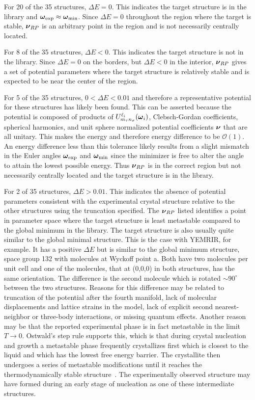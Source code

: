 \documentclass[preprint]{revtex4}
\newcommand{\mb}[1]{\ensuremath{\mbox{\boldmath $ #1 $}}}
\begin{document}
For 20 of the 35 structures, $\Delta E=0$.  This indicates the
target structure is in the library and
$\mb{\omega}_{\mathrm{exp}}\approx \mb{\omega}_{\mathrm{min}}$.
Since $\Delta E=0$ throughout the region where the target is stable,
$\mb{\nu}_{RP}$ is an arbitrary point in the region and is not
necessarily centrally located.

For 8 of the 35 structures, $\Delta E<0$. This indicates the target
structure is not in the library.  Since $\Delta E=0$ on the borders,
but $\Delta E<0$ in the interior, $\mb{\nu}_{RP}$ gives a set of
potential parameters where the target structure is relatively stable
and is expected to be near the center of the region.

For 5 of the 35 structures, $0< \Delta E < 0.01$ and therefore a
representative potential for these structures has likely been found.
This can be asserted because the potential is composed of products
of $U^{\ell_i}_{m_\tau n_\sigma}(\mb{\omega}_i)$, Clebsch-Gordan
coefficients, spherical harmonics, and unit sphere normalized
potential coefficients $\mb{\nu}$ that are all unitary.  This makes
the energy and therefore energy difference to be $\mathcal{O}(1)$.
An energy difference less than this tolerance likely results from a
slight mismatch in the Euler angles $\mb{\omega}_{\mathrm{exp}}$ and
$\mb{\omega}_{\mathrm{min}}$ since the minimizer is free to alter
the angle to attain the lowest possible energy.  Thus
$\mb{\nu}_{RP}$ is in the correct region but not necessarily
centrally located and the target structure is in the library.

For 2 of 35 structures, $\Delta E > 0.01$.  This indicates the
absence of potential parameters consistent with the experimental
crystal structure relative to the other structures using the
truncation specified.  The $\mb{\nu}_{RP}$ listed identifies a point
in parameter space where the target structure is least metastable
compared to the global minimum in the library.  The target structure
is also usually quite similar to the global minimal structure. This
is the case with YEMRIR, for example. It has a positive $\Delta E$
but is similar to the global minimum structure, space group 132 with
molecules at Wyckoff point a. Both have two molecules per unit cell
and one of the molecules, that at (0,0,0) in both structures, has
the same orientation.  The difference is the second molecule which
is rotated $\sim 90^\circ$ between the two structures. Reasons for
this difference may be related to truncation of the potential after
the fourth manifold, lack of molecular displacements and lattice
strains in the model, lack of explicit second nearest-neighbor or
three-body interactions, or missing quantum effects.  Another reason
may be that the reported experimental phase is in fact metastable in
the limit $T\rightarrow 0$. Ostwald's step rule supports this, which
is that during crystal nucleation and growth a metastable phase
frequently crystallizes first which is closest to the liquid and
which has the lowest free energy barrier. The crystallite then
undergoes a series of metastable modifications until it reaches the
thermodynamically stable structure~\cite{Schmalzried03}. The
experimentally observed structure may have formed during an early
stage of nucleation as one of these intermediate structures.
\end{document}

